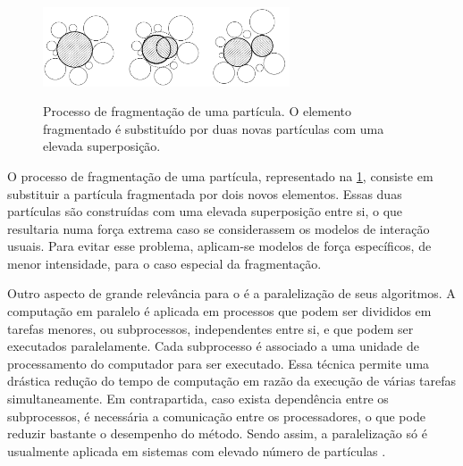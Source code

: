 \begin{figure}[h]
	\caption{Processo de fragmentação de uma partícula. O elemento fragmentado é substituído por duas novas partículas com uma elevada superposição.}
	\centering
		\includegraphics[width=0.65\textwidth]{images/discrete_element_method/fragmentation/particle_fragmentation_process}
	\label{fig:discrete_element_method:fragmentation}
\end{figure}

O processo de fragmentação de uma partícula, representado na \cref{fig:discrete_element_method:fragmentation}, consiste em substituir a partícula fragmentada por dois novos elementos. Essas duas partículas são construídas com uma elevada superposição entre si, o que resultaria numa força extrema caso se considerassem os modelos de interação usuais. Para evitar esse problema, aplicam-se modelos de força específicos, de menor intensidade, para o caso especial da fragmentação.

Outro aspecto de grande relevância para o \DEM{} é a paralelização de seus algoritmos. A computação em paralelo é aplicada em processos que podem ser divididos em tarefas menores, ou subprocessos, independentes entre si, e que podem ser executados paralelamente. Cada subprocesso é associado a uma unidade de processamento do computador para ser executado. Essa técnica permite uma drástica redução do tempo de computação em razão da execução de várias tarefas simultaneamente. Em contrapartida, caso exista dependência entre os subprocessos, é necessária a comunicação entre os processadores, o que pode reduzir bastante o desempenho do método. Sendo assim, a paralelização só é usualmente aplicada em sistemas com elevado número de partículas \cite[p. 128]{bib:computational_granular_dynamics}.

